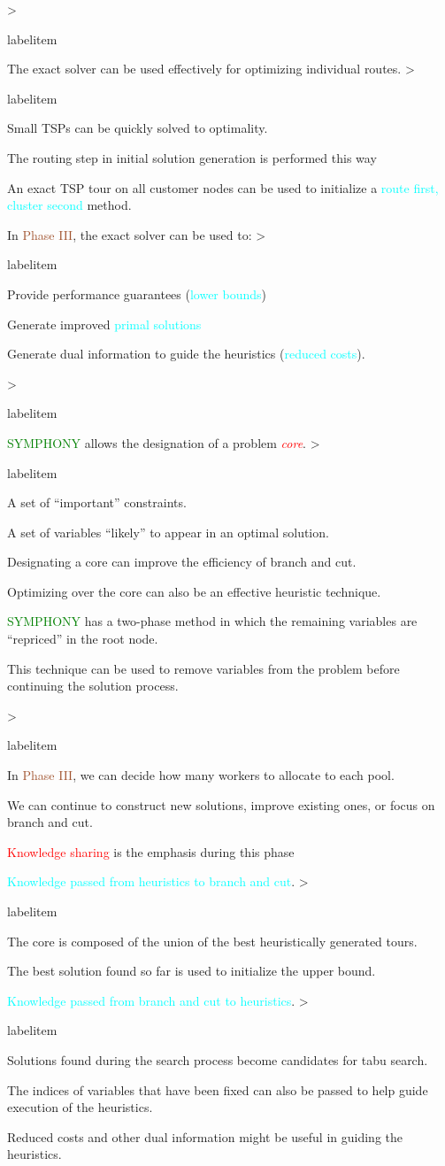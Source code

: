 \documentclass[headrule,landscape]{foils}
\makeatletter
\def\blu#1{\textcolor{blue}{#1}}
\def\red#1{\textcolor{red}{#1}}
\def\grn#1{\textcolor{green}{#1}}
\def\cyn#1{\textcolor{cyan}{#1}}
\def\brn#1{\textcolor{sienna}{#1}}
\newcommand{\foil}[1]{\foilhead[-.6in]{\blu{#1}}}
\newcommand{\bi}{\begin{itemize}}
\newcommand{\ei}{\end{itemize}}
\newcommand{\bb}{\item}
\newcommand{\emred}[1]{{\em \red{#1}}}
\renewenvironment{itemize}[1][0pt]{%
  \ifnum \@itemdepth >\thr@@\@toodeep\else
    \advance\@itemdepth\@ne
    \edef\@itemitem{labelitem\romannumeral\the\@itemdepth}%
    \expandafter
    \list
      \csname\@itemitem\endcsname
      {\def\makelabel##1{\hss\llap{##1}}}\itemsep=#1%
  \fi
}{\endlist}
\makeatother
\begin{document}

\foil{Exact Optimization: Using the Solver}

\bi
\bb The exact solver can be used effectively for optimizing individual
routes.
\bi
\bb Small TSPs can be quickly solved to optimality.
\bb The routing step in initial solution generation is performed this way
\ei
\bb An exact TSP tour on all customer nodes can be used to initialize a
\cyn{route first, cluster second} method.
\bb In \brn{Phase III}, the exact solver can be used to:
\bi
\bb Provide performance guarantees (\cyn{lower bounds})
\bb Generate improved \cyn{primal solutions}
\bb Generate dual information to guide the heuristics
(\cyn{reduced costs}).
\ei
\ei


\foil{Exact Optimization: Core Variables}

\bi
\bb \grn{SYMPHONY} allows the designation of a problem \emred{core}.
\bi
\bb A set of ``important'' constraints. 
\bb A set of variables ``likely'' to appear in an optimal solution.
\ei
\bb Designating a core can improve the efficiency of branch and cut.
\bb Optimizing over the core can also be an effective heuristic technique.
\bb \grn{SYMPHONY} has a two-phase method in which the remaining variables are
``repriced'' in the root node. 
\bb This technique can be used to remove variables from the problem before
continuing the solution process.
\ei


\foil{Putting It All Together}

\bi
\bb In \brn{Phase III}, we can decide how many workers to allocate to each
pool.
\bb We can continue to construct new solutions, improve existing ones, or focus
on branch and cut.
\bb \red{Knowledge sharing} is the emphasis during this phase
\bb \cyn{Knowledge passed from heuristics to branch and cut}.
\bi
\bb The core is composed of the union of the best heuristically generated
tours. 
\bb The best solution found so far is used to initialize the upper bound.
\ei
\bb \cyn{Knowledge passed from branch and cut to heuristics}.
\bi
\bb Solutions found during the search process become candidates for tabu
search. 
\bb The indices of variables that have been fixed can also be passed to help
guide execution of the heuristics.
\bb Reduced costs and other dual information might be useful in guiding the
heuristics.
\ei
\ei
\end{document}
